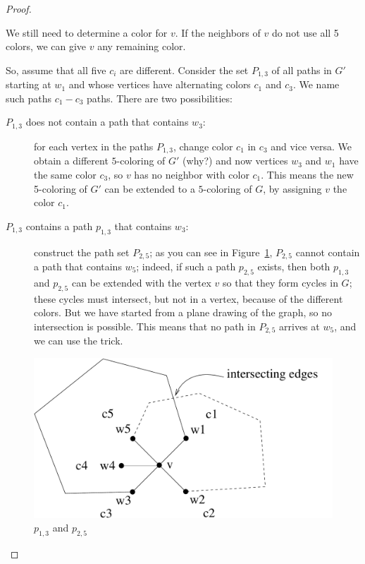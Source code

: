 \begin{proof}
{\begin{description}
We still need to determine a color for $v$. If the neighbors of $v$ do
not use all 5 colors, we can give $v$ any remaining color.

So, assume that all five $c_{i}$ are different. Consider the set
$P_{1,3}$ of all paths in $G'$ starting at $w_{1}$ and whose vertices
have alternating colors $c_{1}$ and $c_{3}$. We name such paths
$c_{1}-c_{3}$ paths.  There are two possibilities:

\begin{description}
\item[$P_{1,3}$ does not contain a path that contains $w_{3}$:]
  for each vertex in the paths $P_{1,3}$, change color $c_{1}$ in
  $c_{3}$ and vice versa. We obtain a different $5$-coloring of $G'$
  (why?) and now vertices $w_{3}$ and $w_{1}$ have the same color
  $c_{3}$, so $v$ has no neighbor with color $c_{1}$. This means the
  new 5-coloring of $G'$ can be extended to a $5$-coloring of $G$, by
  assigning $v$ the color $c_{1}$.

\item[$P_{1,3}$ contains a path $p_{1,3}$ that contains $w_{3}$:]
  construct the path set $P_{2,5}$; as you can see in
  Figure~\ref{5kleuring3}, $P_{2,5}$ cannot contain a path that
  contains $w_{5}$; indeed, if such a path $p_{2,5}$ exists, then both
  $p_{1,3}$ and $p_{2,5}$ can be extended with the vertex $v$ so that
  they form cycles in $G$; these cycles must intersect, but not in a
  vertex, because of the different colors. But we have started from a
  plane drawing of the graph, so no intersection is possible. This
  means that no path in $P_{2,5}$ arrives at $w_{5}$, and we can use
  the trick.
\end{description}

\begin{figure}[ht]
\begin{center}
\includegraphics[width=0.4\linewidth,keepaspectratio]{5kleuring3eng}
\end{center}
\caption{$p_{1,3}$ and $p_{2,5}$ \label{5kleuring3}}
\end{figure}
\end{description}
}
\end{proof}

